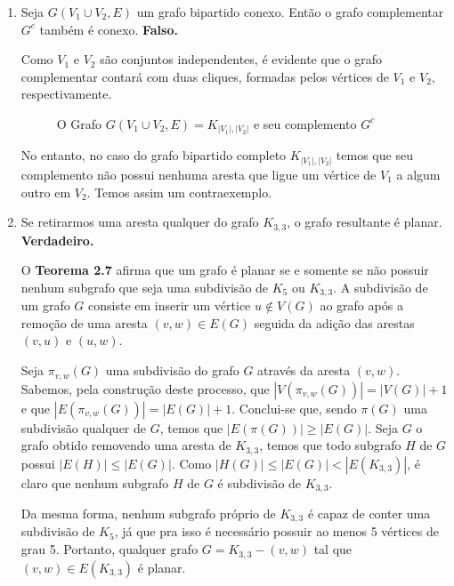 \documentclass{homework}
\begin{document}
\begin{enumerate}[label=\textbf{\arabic*)}]
		\item Seja $G(V_1 \cup V_2, E)$ um grafo bipartido conexo. Então o grafo complementar $G^{c}$ também é conexo. \textbf{Falso.} \par
		
		Como $V_1$ e $V_2$ são conjuntos independentes, é evidente que o grafo complementar contará com duas cliques, formadas pelos vértices de $V_1$ e $V_2$, respectivamente. \par
		
		\begin{figure}[H]
			\centering
			
			\caption{O Grafo $G(V_1 \cup V_2, E) = K_{|V_1|, |V_2|}$ e seu complemento $G^{c}$}
			\label{fig:1.2.1}
		\end{figure}
		
		No entanto, no caso do grafo bipartido completo $K_{|V_1|, |V_2|}$ temos que seu complemento não possui nenhuma aresta que ligue um vértice de $V_1$ a algum outro em $V_2$. Temos assim um contraexemplo. \par
		
	\item Se retirarmos uma aresta qualquer do grafo $K_{3,3}$, o grafo resultante é planar. \textbf{Verdadeiro.} \par
	
	O \textbf{Teorema 2.7}\cite{jayme:18} afirma que um grafo é planar se e somente se não possuir nenhum subgrafo que seja uma subdivisão de $K_5$ ou $K_{3,3}$. A subdivisão de um grafo $G$ consiste em inserir um vértice $u \notin V(G)$ ao grafo após a remoção de uma aresta $(v, w) \in E(G)$ seguida da adição das arestas $(v, u)$ e $(u, w)$. \par
	
	Seja $\pi_{v, w}(G)$ uma subdivisão do grafo $G$ através da aresta $(v, w)$. Sabemos, pela construção deste processo, que $|V(\pi_{v, w}(G))| = |V(G)| + 1$ e que $|E(\pi_{v, w}(G))| = |E(G)| + 1$. Conclui-se que, sendo $\pi(G)$ uma subdivisão qualquer de $G$, temos que $|E(\pi(G))| \ge |E(G)|$. Seja $G$ o grafo obtido removendo uma aresta de $K_{3, 3}$, temos que todo subgrafo $H$ de $G$ possui $|E(H)| \le |E(G)|$. Como $|H(G)| \le |E(G)| < |E(K_{3, 3})|$, é claro que nenhum subgrafo $H$ de $G$ é subdivisão de $K_{3, 3}$. \par
	
	Da mesma forma, nenhum subgrafo próprio de $K_{3, 3}$ é capaz de conter uma subdivisão de $K_5$, já que pra isso é necessário possuir ao menos 5 vértices de grau 5. Portanto, qualquer grafo $G = K_{3, 3} - (v, w)$ tal que $(v, w) \in E(K_{3, 3})$ é planar. \par
	

\end{enumerate}
\end{document}
